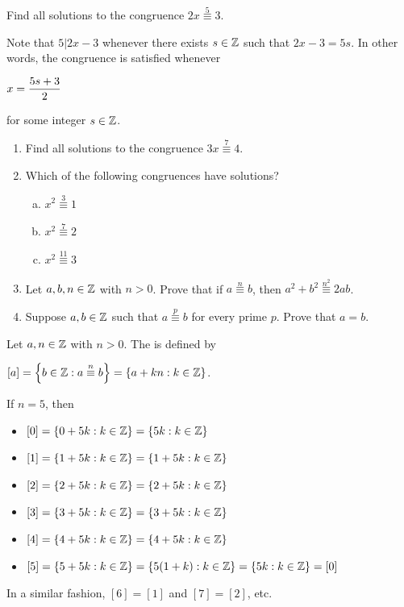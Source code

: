 \documentclass[11pt,fleqn,dvipsnames,usenames]{article}
\newcommand{\p}{\noindent}
\begin{document}
\begin{example}
Find all solutions to the congruence $2x\overset{5}{\equiv} 3$.
\end{example}

\solution Note that $5|2x - 3$ whenever there exists $s\in\mathbb{Z}$ such that $2x - 3 = 5s$.  In other words, the congruence is satisfied whenever
\begin{center}
$\displaystyle{x = \frac{5s + 3}{2}}$
\end{center}
for some integer $s\in\mathbb{Z}$.
\vsp

\begin{exercises} \phantom{ }
\begin{enumerate}[(1)]
\item Find all solutions to the congruence $3x\overset{7}{\equiv} 4$.
\item Which of the following congruences have solutions?
\begin{enumerate}[(a)]
\item $x^{2}\overset{3}{\equiv} 1$
\item $x^{2}\overset{7}{\equiv} 2$
\item $x^{2}\overset{11}{\equiv} 3$
\end{enumerate}
\item Let $a,b,n\in\mathbb{Z}$ with $n > 0$.  Prove that if $a\overset{n}{\equiv}b$, then $a^2 + b^2\overset{n^2}{\equiv}2ab$.
\item Suppose $a,b\in\mathbb{Z}$ such that $a\overset{p}{\equiv}b$ for every prime $p$.  Prove that $a = b$.
\end{enumerate}
\end{exercises}
%
\begin{definition}\label{congruenceclassmodndefn}
Let $a,n\in\mathbb{Z}$ with $n > 0$.  The  is defined by
\begin{center}
$[a] = \left\{b\in\mathbb{Z} : a\overset{n}{\equiv}b\right\} = \left\{a + kn:k\in\mathbb{Z}\right\}$.
\end{center}
\end{definition}
%
\begin{example}
If $n = 5$, then
\begin{itemize}[\ ]
\item $[0] = \left\{0 + 5k:k\in\mathbb{Z}\right\} = \left\{5k:k\in\mathbb{Z}\right\}$
\item $[1] = \left\{1 + 5k:k\in\mathbb{Z}\right\} = \left\{1 + 5k:k\in\mathbb{Z}\right\}$
\item $[2] = \left\{2 + 5k:k\in\mathbb{Z}\right\} = \left\{2 + 5k:k\in\mathbb{Z}\right\}$
\item $[3] = \left\{3 + 5k:k\in\mathbb{Z}\right\} = \left\{3 + 5k:k\in\mathbb{Z}\right\}$
\item $[4] = \left\{4 + 5k:k\in\mathbb{Z}\right\} = \left\{4 + 5k:k\in\mathbb{Z}\right\}$
\item $[5] = \left\{5 + 5k:k\in\mathbb{Z}\right\} = \left\{5(1 + k):k\in\mathbb{Z}\right\} = \left\{5k:k\in\mathbb{Z}\right\} = [0]$
\end{itemize}
\p In a similar fashion, $[6] = [1]$ and $[7] = [2]$, etc.
\end{example}
\end{document}
